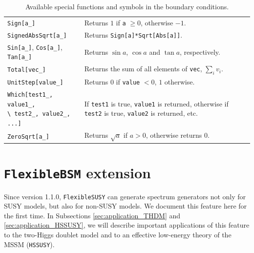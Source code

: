 \documentclass[final,3p,11pt,pdflatex]{elsarticle}
\makeatletter
\newcommand{\modelname}[1]{\texttt{#1}\@\xspace}
\newcommand{\fs}{\texttt{FlexibleSUSY}\@\xspace}
\newcommand{\HSSUSY}{\modelname{HSSUSY}}
\newcommand{\fbsm}{\texttt{FlexibleBSM}\@\xspace}
\newcommand{\code}[1]{\lstinline|#1|}  %
\newcommand{\multilinecell}[2][c]{%
  \begin{tabular}[#1]{@{}c@{}}#2\end{tabular}}
\makeatother
\begin{document}
\begin{table}[h!]
{\begin{tabularx}{1.05\textwidth}{lX}
    \code{Sign[a_]} &
    Returns $1$ if \code{a} $\geq 0$, otherwise $-1$. \\

    \code{SignedAbsSqrt[a_]} &
    Returns \code{Sign[a]*Sqrt[Abs[a]]}. \\

    \code{Sin[a_]}, \code{Cos[a_]}, \code{Tan[a_]} &
    Returns $\sin a$, $\cos a$ and $\tan a$, respectively. \\

    \code{Total[vec_]} &
    Returns the sum of all elements of \code{vec}, $\sum_i v_i$. \\

    \code{UnitStep[value_]} &
    Returns $0$ if \code{value} $<0$, $1$ otherwise. \\

    \multilinecell[t]{\code{Which[test1_, value1_,}\\\code{\ test2_, value2_, ...]}} &
    If \code{test1} is true, \code{value1} is returned, otherwise
    if \code{test2} is true, \code{value2} is returned, etc. \\

    \code{ZeroSqrt[a_]} &
    Returns $\sqrt{a}$ if $a>0$, otherwise returns $0$. \\

    \bottomrule
  \end{tabularx}}
  \caption{Available special functions and symbols in the boundary conditions.}
  \label{tab:bcs_functions}
\end{table}

\section{\fbsm extension}
\label{sec:fbsm}

Since version 1.1.0, \fs can generate spectrum generators not
only for SUSY models, but also for non-SUSY models.  We document this
feature here for the first time.  In Subsections
\ref{sec:application_THDM} and \ref{sec:application_HSSUSY}, we will
describe important applications of this feature to the two-Higgs
doublet model and to an effective low-energy theory of the MSSM
(\HSSUSY).
\end{document}
